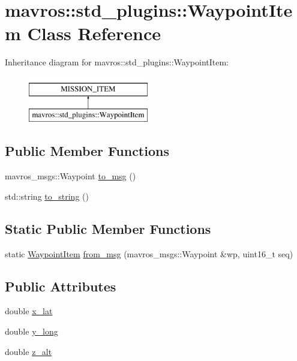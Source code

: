 \hypertarget{classmavros_1_1std__plugins_1_1WaypointItem}{}\section{mavros\+::std\+\_\+plugins\+::Waypoint\+Item Class Reference}
\label{classmavros_1_1std__plugins_1_1WaypointItem}
Inheritance diagram for mavros\+::std\+\_\+plugins\+::Waypoint\+Item\+:\begin{figure}[H]
\begin{center}
\leavevmode
\includegraphics[height=2.000000cm]{classmavros_1_1std__plugins_1_1WaypointItem}
\end{center}
\end{figure}
\subsection*{Public Member Functions}
\begin{DoxyCompactItemize}
\item 
mavros\+\_\+msgs\+::\+Waypoint \mbox{\hyperlink{group__plugin_ga5c25947a645ea543c7b198bb3c497ac9}{to\+\_\+msg}} ()
\item 
std\+::string \mbox{\hyperlink{group__plugin_ga6eeb2ff1ea806b477e297f08f356115a}{to\+\_\+string}} ()
\end{DoxyCompactItemize}
\subsection*{Static Public Member Functions}
\begin{DoxyCompactItemize}
\item 
static \mbox{\hyperlink{classmavros_1_1std__plugins_1_1WaypointItem}{Waypoint\+Item}} \mbox{\hyperlink{group__plugin_gac1275a7e8aa3ffb259d1009078a56d44}{from\+\_\+msg}} (mavros\+\_\+msgs\+::\+Waypoint \&wp, uint16\+\_\+t seq)
\end{DoxyCompactItemize}
\subsection*{Public Attributes}
\begin{DoxyCompactItemize}
\item 
double \mbox{\hyperlink{group__plugin_gacd8bc92567aa5d184991c15ad1e0823b}{x\+\_\+lat}}
\item 
double \mbox{\hyperlink{group__plugin_gac45e1689a1d68f56e3682413006287f6}{y\+\_\+long}}
\item 
double \mbox{\hyperlink{group__plugin_ga6f6da6509e38cfdd28e62615625504dd}{z\+\_\+alt}}
\end{DoxyCompactItemize}



